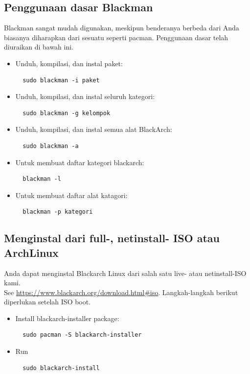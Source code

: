 \documentclass[a4paper, oneside, 11pt]{book}
\begin{document}
\subsection{Penggunaan dasar Blackman} Blackman sangat mudah digunakan, meskipun benderanya berbeda dari Anda
biasanya diharapkan dari sesuatu seperti pacman. Penggunaan dasar telah diuraikan di bawah ini.
\begin{itemize}
\item Unduh, kompilasi, dan instal paket:
\begin{lstlisting}
  sudo blackman -i paket
\end{lstlisting}

\item Unduh, kompilasi, dan instal seluruh kategori:
\begin{lstlisting}
  sudo blackman -g kelompok
\end{lstlisting}

\item Unduh, kompilasi, dan instal semua alat BlackArch:
\begin{lstlisting}
  sudo blackman -a
\end{lstlisting}

\item Untuk membuat daftar kategori blackarch:
\begin{lstlisting}
  blackman -l
\end{lstlisting}

\item Untuk membuat daftar alat katagori:
\begin{lstlisting}
  blackman -p kategori
\end{lstlisting}

\end{itemize}

\subsection{Menginstal dari full-, netinstall- ISO atau ArchLinux}
Anda dapat menginstal Blackarch Linux dari salah satu live- atau netinstall-ISO kami.\\See
\url{https://www.blackarch.org/download.html#iso}. Langkah-langkah berikut
diperlukan setelah ISO boot.
\begin{itemize}
\item Install blackarch-installer package:
\begin{lstlisting}
  sudo pacman -S blackarch-installer
\end{lstlisting}

\item Run
\begin{lstlisting}
  sudo blackarch-install
\end{lstlisting}

\end{itemize}
\end{document}

